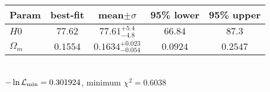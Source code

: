 \begin{tabular}{|l|c|c|c|c|} 
 \hline 
Param & best-fit & mean$\pm\sigma$ & 95\% lower & 95\% upper \\ \hline 
$H0$ &$77.62$ & $77.61_{-4.8}^{+5.4}$ & $66.84$ & $87.3$ \\ 
$\Omega_{m }$ &$0.1554$ & $0.1634_{-0.054}^{+0.023}$ & $0.0924$ & $0.2547$ \\ 
\hline 
 \end{tabular} \\ 
$-\ln{\cal L}_\mathrm{min} =0.301924$, minimum $\chi^2=0.6038$ \\ 
